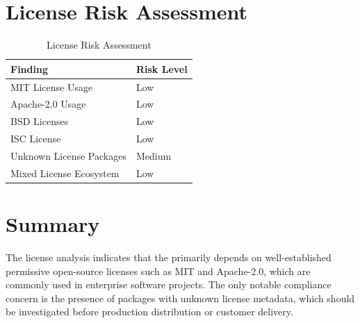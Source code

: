 \section{License Risk Assessment}

\begin{table}[H]
\centering
\small
\renewcommand{\arraystretch}{1.3}

\begin{tabular}{p{6cm}p{5cm}}
\toprule
\rowcolor{ZWPrimary}
\textbf{\color{white}Finding} & \textbf{\color{white}Risk Level} \\
\midrule
MIT License Usage & Low \\
Apache-2.0 Usage & Low \\
BSD Licenses & Low \\
ISC License & Low \\
Unknown License Packages & Medium \\
Mixed License Ecosystem & Low \\
\bottomrule
\end{tabular}
\caption{License Risk Assessment}
\end{table}

\vspace{0.4cm}


\section{Summary}

The license analysis indicates that the \textbf{\ProjectName} primarily depends on well-established permissive open-source licenses such as MIT and Apache-2.0, which are commonly used in enterprise software projects. The only notable compliance concern is the presence of packages with unknown license metadata, which should be investigated before production distribution or customer delivery.
